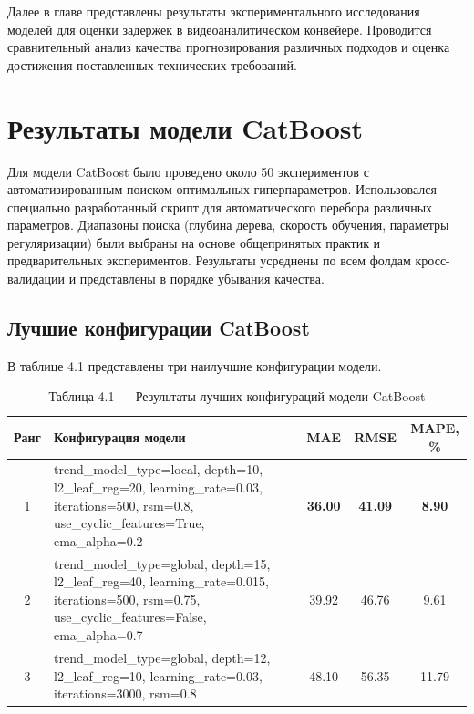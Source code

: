 Далее в главе представлены результаты экспериментального исследования моделей для оценки задержек в видеоаналитическом конвейере. Проводится сравнительный анализ качества прогнозирования различных подходов и оценка достижения поставленных технических требований.

\section{Результаты модели CatBoost}
\label{sec:catboost_results}

Для модели CatBoost было проведено около 50 экспериментов с автоматизированным поиском оптимальных гиперпараметров. Использовался специально разработанный скрипт для автоматического перебора различных параметров. Диапазоны поиска (глубина дерева, скорость обучения, параметры регуляризации) были выбраны на основе общепринятых практик и предварительных экспериментов. Результаты усреднены по всем фолдам кросс-валидации и представлены в порядке убывания качества.

\subsection{Лучшие конфигурации CatBoost}

В таблице 4.1 представлены три наилучшие конфигурации модели.

\begin{table}[H]
	\centering
	\caption*{Таблица 4.1 --- Результаты лучших конфигураций модели CatBoost}
	\begin{tabular}{|c|p{8cm}|c|c|c|}
		\hline
		\textbf{Ранг} & \textbf{Конфигурация модели} & \textbf{MAE} & \textbf{RMSE} & \textbf{MAPE, \%} \\
		\hline
		1 & trend\_model\_type=local, depth=10, l2\_leaf\_reg=20, learning\_rate=0.03, iterations=500, rsm=0.8, use\_cyclic\_features=True, ema\_alpha=0.2 & \textbf{36.00} & \textbf{41.09} & \textbf{8.90} \\
		\hline
		2 & trend\_model\_type=global, depth=15, l2\_leaf\_reg=40, learning\_rate=0.015, iterations=500, rsm=0.75, use\_cyclic\_features=False, ema\_alpha=0.7 & 39.92 & 46.76 & 9.61 \\
		\hline
		3 & trend\_model\_type=global, depth=12, l2\_leaf\_reg=10, learning\_rate=0.03, iterations=3000, rsm=0.8 & 48.10 & 56.35 & 11.79 \\
		\hline
	\end{tabular}
	\label{tab:catboost_results}
\end{table}

